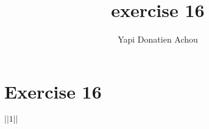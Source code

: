\documentclass[10pt,a4paper]{report}
\author{Yapi Donatien Achou}
\title{exercise 16}
\begin{document}
\maketitle

\section{Exercise 16}
$|| 1||$
\end{document}
